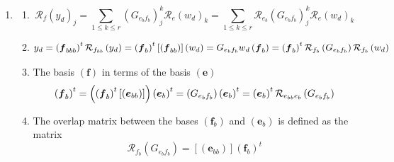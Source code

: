 \documentclass[aps,preprint]{revtex4}
\begin{document}
\begin{enumerate}
\item 
\begin{enumerate}
\item 
\begin{equation}
\mathcal{R}_{f}\left( y_{d}\right) _{j}=\sum_{1\leq k\leq r}\left(
G_{e_{b}f_{b}}\right) _{j}^{k}\mathcal{R}_{e}\left( w_{d}\right)
_{k}=\sum_{1\leq k\leq r}\mathcal{R}_{e_{b}}\left( G_{e_{b}f_{b}}\right)
_{j}^{k}\mathcal{R}_{e}\left( w_{d}\right) _{k}
\end{equation}

\item 
\begin{equation}
y_{d}=\left( \boldsymbol{f}_{bbb}\right) ^{t}\mathcal{R}_{f_{bb}}\left(
y_{d}\right) =\left( \boldsymbol{f}_{b}\right) ^{t}\left[ \left( \boldsymbol{%
f}_{bb}\right) \right] \left( w_{d}\right) =G_{e_{b}f_{b}}w_{d}\left( 
\boldsymbol{f}_{b}\right) =\left( \boldsymbol{f}_{b}\right) ^{t}\mathcal{R}%
_{f_{b}}\left( G_{e_{b}f_{b}}\right) \mathcal{R}_{f_{b}}\left( w_{d}\right)
\end{equation}

\item The basis $\left( \boldsymbol{f}\right) $ in terms of the basis $%
\left( \boldsymbol{e}\right) $ 
\begin{equation}
\left( \boldsymbol{f}_{b}\right) ^{t}=\left( \left( \boldsymbol{f}%
_{b}\right) ^{t}\left[ \left( \boldsymbol{e}_{bb}\right) \right] \right)
\left( \boldsymbol{e}_{b}\right) ^{t}=\left( G_{e_{b}f_{b}}\right) \left( 
\boldsymbol{e}_{b}\right) ^{t}=\left( \boldsymbol{e}_{b}\right) ^{t}\mathcal{%
R}_{e_{bb}e_{b}}\left( G_{e_{b}f_{b}}\right)
\end{equation}

\item The overlap matrix between the bases $\left( \boldsymbol{f}_{b}\right) 
$ and $\left( \boldsymbol{e}_{b}\right) $ is defined as the matrix 
\begin{equation}
\mathcal{R}_{f_{b}}\left( G_{e_{b}f_{b}}\right) =\left[ \left( \boldsymbol{e}%
_{bb}\right) \right] \left( \boldsymbol{f}_{b}\right) ^{t}
\end{equation}


\end{enumerate}
\end{enumerate}
\end{document}
